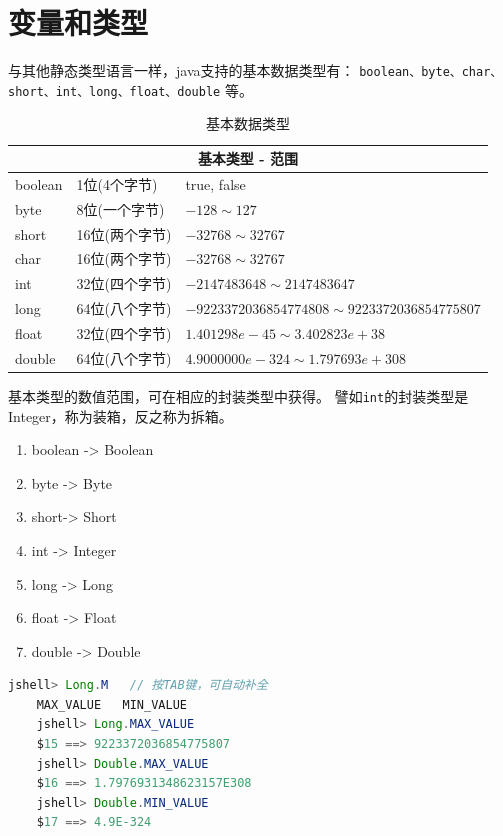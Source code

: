 \section{变量和类型}
与其他静态类型语言一样，java支持的基本数据类型有：
\lstinline{boolean、byte、char、short、int、long、float、double}
等。

\begin{table}[!htbp] \centering \small
	\caption{基本数据类型}
\begin{tabular}{|p{1.5cm}|p{3cm}|p{8.5cm}|}
\toprule
	\multicolumn{3}{|c|}{基本类型 - 范围}\\
\midrule
  boolean&1位(4个字节)\footnotemark&true, false \\
	byte&8位(一个字节)&$-128\sim127$\\
	short&16位(两个字节)&$-32768\sim32767$\\
	char&16位(两个字节)&$-32768\sim32767$\\
	int&32位(四个字节)&$-2147483648\sim2147483647$\\
	long&64位(八个字节)&$-9223372036854774808\sim9223372036854775807$\\
	float&32位(四个字节)&$1.401298e-45\sim3.402823e+38$\\
	double&64位(八个字节)&$4.9000000e-324\sim1.797693e+308$\\
\bottomrule
\end{tabular}
\end{table}


基本类型的数值范围，可在相应的封装类型中获得。
譬如\lstinline{int}的封装类型是Integer，称为装箱，反之称为拆箱。
\begin{enumerate}
	\item boolean -> Boolean
	\item byte -> Byte
	\item short-> Short
	\item int -> Integer
	\item long -> Long
	\item float -> Float
	\item double -> Double
\end{enumerate}

\begin{lstlisting}[language=Java, backgroundcolor=\color{lightgray!10}]
	jshell> Long.M   // 按TAB键，可自动补全
	MAX_VALUE   MIN_VALUE   
	jshell> Long.MAX_VALUE
	$15 ==> 9223372036854775807
	jshell> Double.MAX_VALUE
	$16 ==> 1.7976931348623157E308
	jshell> Double.MIN_VALUE
	$17 ==> 4.9E-324
\end{lstlisting}

